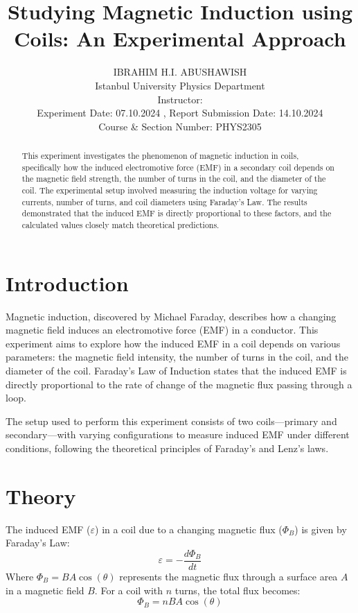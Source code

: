 \documentclass[journal]{IEEEtran}
\begin{document}
\title{Studying Magnetic Induction using Coils: An Experimental Approach}
\author{IBRAHIM H.I. ABUSHAWISH\\
Istanbul University Physics Department\\
Instructor: \hspace{10px} \\
Experiment Date: 07.10.2024 , Report Submission Date: 14.10.2024\\
Course \& Section Number: PHYS2305}

\maketitle

\begin{abstract}
    This experiment investigates the phenomenon of magnetic induction in coils, specifically how the induced electromotive force (EMF) in a secondary coil depends on the magnetic field strength, the number of turns in the coil, and the diameter of the coil. The experimental setup involved measuring the induction voltage for varying currents, number of turns, and coil diameters using Faraday's Law. The results demonstrated that the induced EMF is directly proportional to these factors, and the calculated values closely match theoretical predictions.
\end{abstract}

\section{Introduction}
Magnetic induction, discovered by Michael Faraday, describes how a changing magnetic field induces an electromotive force (EMF) in a conductor. This experiment aims to explore how the induced EMF in a coil depends on various parameters: the magnetic field intensity, the number of turns in the coil, and the diameter of the coil. Faraday’s Law of Induction states that the induced EMF is directly proportional to the rate of change of the magnetic flux passing through a loop.

The setup \cite[3.1.2]{lab_manual} used to perform this experiment consists of two coils—primary and secondary—with varying configurations to measure induced EMF under different conditions, following the theoretical principles of Faraday's and Lenz's laws.

\section{Theory}
The induced EMF (\(\varepsilon\)) in a coil due to a changing magnetic flux (\(\Phi_B\)) is given by Faraday’s Law:
\begin{equation}
    \varepsilon = - \frac{d\Phi_B}{dt}
\end{equation}
Where \(\Phi_B = B A \cos(\theta)\) represents the magnetic flux through a surface area \(A\) in a magnetic field \(B\). For a coil with \(n\) turns, the total flux becomes:
\begin{equation}
    \Phi_B = n B A \cos(\theta)
\end{equation}
\end{document}
